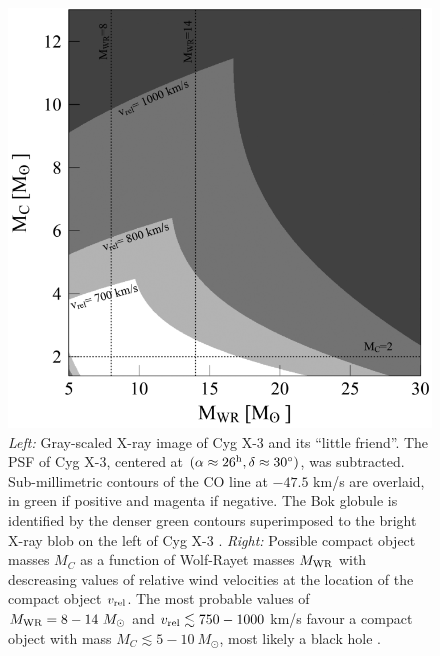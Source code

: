 \documentclass[a4paper,titlepage]{book}     	%
\newcommand{\sun}{\ensuremath{_\odot}}
\newcommand{\msun}{\ensuremath{M\sun}}
\newcommand{\mwr}{\ensuremath{M_\textup{WR}}}
\begin{document}
\begin{figure}[t!]
\begin{minipage}{.49\textwidth}
		\includegraphics[width=\textwidth]{./images/CygX3massBH}	
	\end{minipage}
	\caption{\emph{Left:} Gray-scaled X-ray image of Cyg X-3 and its ``little friend''. The PSF of Cyg X-3, centered at $(\alpha \approx 26^{\rm h}, \delta \approx 30^{\circ})$, was subtracted. Sub-millimetric contours of the CO line at $-47.5$ km/s are overlaid, in green if positive and magenta if negative. The Bok globule is identified by the denser green contours superimposed to the bright X-ray blob on the left of Cyg X-3 \cite{CygX-3_McCollough2016_Observation}. \emph{Right:} Possible compact object masses $M_C$ as a function of Wolf-Rayet masses $\mwr$ with descreasing values of relative wind velocities at the location of the compact object $v_{\rm rel}$. The most probable values of $\mwr = 8-14~\msun$ and $v_{\rm rel} \lesssim 750-1000$ km/s favour a compact object with mass $M_C \lesssim 5-10~\msun$, most likely a black hole \cite{CygX-3_Koljonen2017}.}\label{fig:CygX3}
\end{figure}
\end{document}
